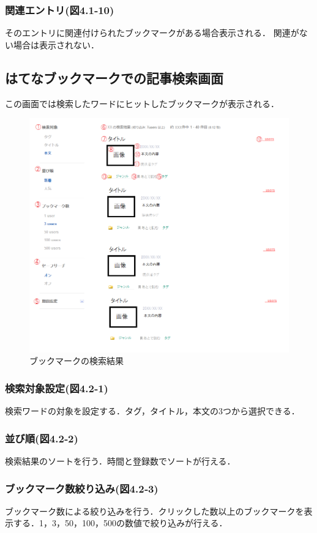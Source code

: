 \subsubsection{関連エントリ(図4.1‐10)}
そのエントリに関連付けられたブックマークがある場合表示される．
関連がない場合は表示されない．

\newpage

\subsection{はてなブックマークでの記事検索画面}
この画面では検索したワードにヒットしたブックマークが表示される．

\begin{figure}[htb]
\centering
\includegraphics[width=15cm]{hatena-3.png}
\caption{ブックマークの検索結果}\label{hatenasearch}
\end{figure}

\subsubsection{検索対象設定(図4.2‐1)}
検索ワードの対象を設定する．タグ，タイトル，本文の3つから選択できる．
\subsubsection{並び順(図4.2‐2)}
検索結果のソートを行う．時間と登録数でソートが行える．
\subsubsection{ブックマーク数絞り込み(図4.2‐3)}
ブックマーク数による絞り込みを行う．クリックした数以上のブックマークを表示する．1，3，50，100，500の数値で絞り込みが行える．

